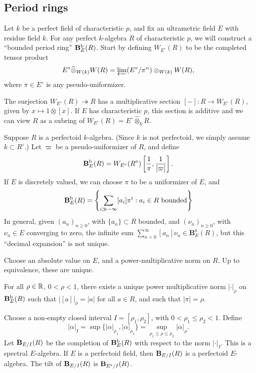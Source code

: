 \subsection{Period rings}

Let $k$ be a perfect field of characteristic $p$, and fix an ultrametric field 
$E$ with residue field $k$. For any perfect $k$-algebra $R$ of characteristic 
$p$, we will construct a ``bounded period ring'' $\mathbf{B}_E^\text{b}(R)$. Start by 
defining $W_{E^\circ}(R)$ to be the completed tensor product 
\[
  E^\circ\widehat\otimes_{W(k)} W(R) = \varprojlim (E^\circ/\pi^n)\otimes_{W(k)} W(R) ,
\]
where $\pi\in E^\circ$ is any pseudo-uniformizer. 

The surjection $W_{E^\circ}(R) \twoheadrightarrow R$ has a multiplicative 
section $[-]:R\to W_{E^\circ}(R)$, given by $x\mapsto 1\otimes [x]$. If $E$ 
has characteristic $p$, this section is additive and we can view $R$ as a 
subring of $W_{E^\circ}(R) = E^\circ\widehat\otimes_k R$. 

Suppose $R$ is a perfectoid $k$-algebra. (Since $k$ is not perfectoid, we simply 
assume $k\subset R^\circ$.) Let $\varpi$ be a pseudo-uniformizer of $R$, and 
define 
\[
  \mathbf{B}_E^\text{b}(R) = W_{E^\circ}(R^\circ)\left[\frac 1 \pi, \frac{1}{[\varpi]}\right] .
\]
If $E$ is discretely valued, we can choose $\pi$ to be a uniformizer of $E$, 
and  
\[
  \mathbf{B}_E^\text{b}(R) = \left\{\sum_{i\gg -\infty} [a_i] \pi^i: a_i\in R\text{ bounded}\right\}
\]
In general, given $(a_n)_{n\geqslant 0}$, with $\{a_n\}\subset R$ bounded, and 
$(\nu_n)_{n\geqslant 0}$, with $\nu_n\in E$ converging to zero, the infinite sum 
$\sum_{n=0}^\infty [a_n] \nu_n \in \mathbf B_E^b(R)$, but this ``decimal expansion'' 
is not unique. 

Choose an absolute value on $E$, and a power-multiplicative norm on $R$. Up to 
equivalence, these are unique. 

\begin{proposition}
For all $\rho\in \mathbb{R}$, $0<\rho<1$, there exists a unique power multiplicative norm 
$|\cdot |_\rho$ on $\mathbf{B}_E^\textnormal{b}(R)$ such that 
$|[a]|_\rho = |a|$ for all $a\in R$, and such that $|\pi|=\rho$. 
\end{proposition}

Choose a non-empty closed interval $I=[\rho_1,\rho_2]$, with 
$0<\rho_1\leqslant \rho_2<1$. Define 
\[
  |\alpha|_I = \sup\{|\alpha|_{\rho_1},|\alpha|_{\rho_2}\} = \sup_{\rho_1\leqslant \rho\leqslant \rho_2} |\alpha|_\rho .
\]
Let $\mathbf{B}_{E/I}(R)$ be the completion of $\mathbf{B}_E^\text{b}(R)$ with respect to 
the norm $|\cdot |_I$. This is a spectral $E$-algebra. If $E$ is a perfectoid 
field, then $\mathbf{B}_{E/I}(R)$ is a perfectoid $E$-algebra. The tilt of 
$\mathbf{B}_{E/I}(R)$ is $\mathbf{B}_{E^\flat/I}(R)$. 

